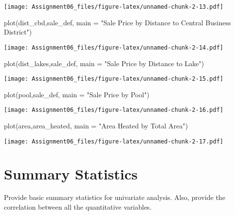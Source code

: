 \documentclass[
]{article}
\newenvironment{Shaded}{\begin{snugshade}}{\end{snugshade}}
\newcommand{\AttributeTok}[1]{\textcolor[rgb]{0.77,0.63,0.00}{#1}}
\newcommand{\FunctionTok}[1]{\textcolor[rgb]{0.00,0.00,0.00}{#1}}
\newcommand{\NormalTok}[1]{#1}
\newcommand{\StringTok}[1]{\textcolor[rgb]{0.31,0.60,0.02}{#1}}
\begin{document}
\texttt{[image: Assignment06\_files/figure-latex/unnamed-chunk-2-13.pdf]}

\begin{Shaded}
\begin{Highlighting}[]
\FunctionTok{plot}\NormalTok{(dist\_cbd,sale\_def, }\AttributeTok{main =} \StringTok{"Sale Price by Distance to Central Business District"}\NormalTok{)}
\end{Highlighting}
\end{Shaded}

\texttt{[image: Assignment06\_files/figure-latex/unnamed-chunk-2-14.pdf]}

\begin{Shaded}
\begin{Highlighting}[]
\FunctionTok{plot}\NormalTok{(dist\_lakes,sale\_def, }\AttributeTok{main =} \StringTok{"Sale Price by Distance to Lake"}\NormalTok{)}
\end{Highlighting}
\end{Shaded}

\texttt{[image: Assignment06\_files/figure-latex/unnamed-chunk-2-15.pdf]}

\begin{Shaded}
\begin{Highlighting}[]
\FunctionTok{plot}\NormalTok{(pool,sale\_def, }\AttributeTok{main =} \StringTok{"Sale Price by Pool"}\NormalTok{)}
\end{Highlighting}
\end{Shaded}

\texttt{[image: Assignment06\_files/figure-latex/unnamed-chunk-2-16.pdf]}

\begin{Shaded}
\begin{Highlighting}[]
\FunctionTok{plot}\NormalTok{(area,area\_heated, }\AttributeTok{main =} \StringTok{"Area Heated by Total Area"}\NormalTok{)}
\end{Highlighting}
\end{Shaded}

\texttt{[image: Assignment06\_files/figure-latex/unnamed-chunk-2-17.pdf]}

\hypertarget{summary-statistics}{%
\section{Summary Statistics}\label{summary-statistics}}

Provide basic summary statistics for univariate analysis. Also, provide
the correlation between all the quantitative variables.
\end{document}
